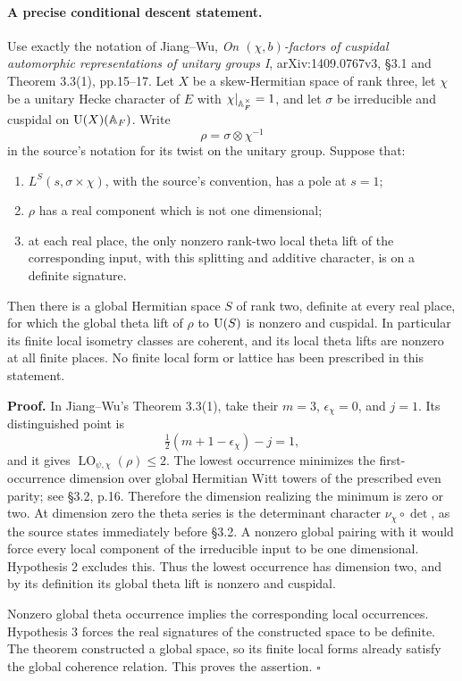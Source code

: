 \documentclass[11pt]{article}
\theoremstyle{definition}\newtheorem{definition}[theorem]{Definition}\newtheorem{remark}[theorem]{Remark}
\begin{document}
\paragraph{A precise conditional descent statement.}
Use exactly the notation of Jiang--Wu, \emph{On $(\chi,b)$-factors of cuspidal automorphic representations of unitary groups I}, arXiv:1409.0767v3, \S3.1 and Theorem 3.3(1), pp.15--17. Let $X$ be a skew-Hermitian space of rank three, let $\chi$ be a unitary Hecke character of $E$ with $\chi|_{\mathbb A_F^\times}=1$, and let $\sigma$ be irreducible and cuspidal on $\operatorname{U}(X)(\mathbb A_F)$. Write
\[
 \rho=\sigma\otimes\chi^{-1}
 \tag{B16a}
\]
in the source's notation for its twist on the unitary group. Suppose that:
\begin{enumerate}
\item $L^S(s,\sigma\times\chi)$, with the source's convention, has a pole at $s=1$;
\item $\rho$ has a real component which is not one dimensional;
\item at each real place, the only nonzero rank-two local theta lift of the corresponding input, with this splitting and additive character, is on a definite signature.
\end{enumerate}
Then there is a global Hermitian space $S$ of rank two, definite at every real place, for which the global theta lift of $\rho$ to $\operatorname{U}(S)$ is nonzero and cuspidal. In particular its finite local isometry classes are coherent, and its local theta lifts are nonzero at all finite places. No finite local form or lattice has been prescribed in this statement.

\textbf{Proof.}
In Jiang--Wu's Theorem 3.3(1), take their $m=3$, $\epsilon_\chi=0$, and $j=1$. Its distinguished point is
\[
 \tfrac12(m+1-\epsilon_\chi)-j=1,
\]
and it gives $\operatorname{LO}_{\psi,\chi}(\rho)\leq2$. The lowest occurrence minimizes the first-occurrence dimension over global Hermitian Witt towers of the prescribed even parity; see \S3.2, p.16. Therefore the dimension realizing the minimum is zero or two. At dimension zero the theta series is the determinant character $\nu_\chi\circ\det$, as the source states immediately before \S3.2. A nonzero global pairing with it would force every local component of the irreducible input to be one dimensional. Hypothesis 2 excludes this. Thus the lowest occurrence has dimension two, and by its definition its global theta lift is nonzero and cuspidal.

Nonzero global theta occurrence implies the corresponding local occurrences. Hypothesis 3 forces the real signatures of the constructed space to be definite. The theorem constructed a global space, so its finite local forms already satisfy the global coherence relation. This proves the assertion. \hfill$\square$
\end{document}
